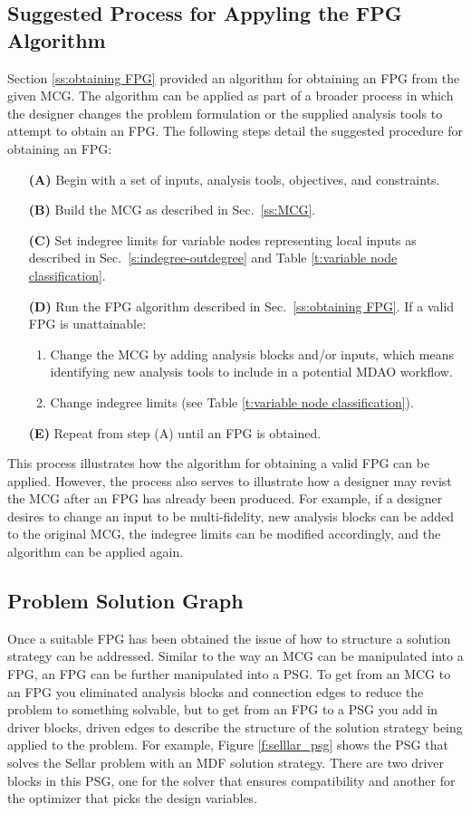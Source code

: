 \subsection{Suggested Process for Appyling the FPG Algorithm}
\label{ss:process}
Section \ref{ss:obtaining FPG} provided an algorithm for obtaining an FPG from the given MCG. 
The algorithm can be applied as part of a broader process in which the designer changes the problem formulation or the supplied analysis tools to attempt to obtain an FPG. The following steps detail the suggested procedure for obtaining an FPG:
\begin{enumerate}
\item[\bf{(A)}] Begin with a set of inputs, analysis tools, objectives, and constraints.
\item[\bf{(B)}] Build the MCG as described in Sec.~\ref{ss:MCG}.
\item[\bf{(C)}] Set indegree limits for variable nodes representing local inputs as described in Sec.~\ref{s:indegree-outdegree} and Table \ref{t:variable node classification}.
\item[\bf{(D)}] Run the FPG algorithm described in Sec.~\ref{ss:obtaining FPG}. If a valid FPG is unattainable:
		\begin{enumerate}
\item Change the MCG by adding analysis blocks and/or inputs, which means identifying new analysis tools to include in a potential MDAO workflow.
\item Change indegree limits (see Table \ref{t:variable node classification}).
\end{enumerate}
\item[\bf{(E)}] Repeat from step (A) until an FPG is obtained.
\end{enumerate}
This process illustrates how the algorithm for obtaining a valid FPG can be applied. However, the process also serves to illustrate how a designer may revist the MCG after an FPG has already been produced. For example, if a designer desires to change an input to be multi-fidelity, new analysis blocks can be added to the original MCG, the indegree limits can be modified accordingly, and the algorithm can be applied again.



\subsection{Problem Solution Graph}
Once a suitable FPG has been obtained the issue of how to structure a solution strategy 
can be addressed. Similar to the way an MCG can be manipulated into a FPG, an FPG can be
further manipulated into a PSG. To get from an MCG to an FPG you eliminated analysis blocks and
connection edges to reduce the problem to something solvable, but to get from an FPG to a PSG you 
add in driver blocks, driven edges to describe the structure of the solution strategy being applied 
to the problem. For example, Figure \ref{f:selllar_psg} shows the PSG that solves the Sellar problem 
with an MDF solution strategy. There are two driver blocks in this PSG, one for the solver that 
ensures compatibility and another for the optimizer that picks the design variables. 

